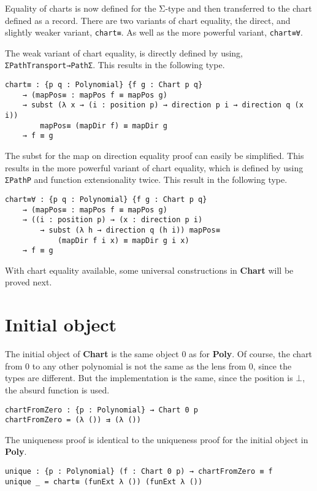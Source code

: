 Equality of charts is now defined for the Σ-type and then transferred to the chart defined as a record. There are two variants of chart equality, the direct, and slightly weaker variant, \texttt{chart≡}. As well as the more powerful variant, \texttt{chart≡∀}.

The weak variant of chart equality, is directly defined by using, \texttt{ΣPathTransport→PathΣ}. This results in the following type.

\begin{verbatim}
chart≡ : {p q : Polynomial} {f g : Chart p q}
    → (mapPos≡ : mapPos f ≡ mapPos g)
    → subst (λ x → (i : position p) → direction p i → direction q (x i))
        mapPos≡ (mapDir f) ≡ mapDir g
    → f ≡ g
\end{verbatim}

The subst for the map on direction equality proof can easily be simplified. This results in the more powerful variant of chart equality, which is defined by using \texttt{ΣPathP} and function extensionality twice. This result in the following type.
\begin{verbatim}
chart≡∀ : {p q : Polynomial} {f g : Chart p q}
    → (mapPos≡ : mapPos f ≡ mapPos g)
    → ((i : position p) → (x : direction p i) 
        → subst (λ h → direction q (h i)) mapPos≡ 
            (mapDir f i x) ≡ mapDir g i x)
    → f ≡ g
\end{verbatim}


With chart equality available, some universal constructions in \textbf{Chart} will be proved next. 


\section{Initial object}
The initial object of \textbf{Chart} is the same object 0 as for \textbf{Poly}. Of course, the chart from $0$ to any other polynomial is not the same as the lens from $0$, since the types are different. But the implementation is the same, since the position is $\bot$, the absurd function is used.

\begin{verbatim}
chartFromZero : {p : Polynomial} → Chart 0 p
chartFromZero = (λ ()) ⇉ (λ ())
\end{verbatim}

The uniqueness proof is identical to the uniqueness proof for the initial object in \textbf{Poly}.

\begin{verbatim}
unique : {p : Polynomial} (f : Chart 0 p) → chartFromZero ≡ f
unique _ = chart≡ (funExt λ ()) (funExt λ ())
\end{verbatim}

